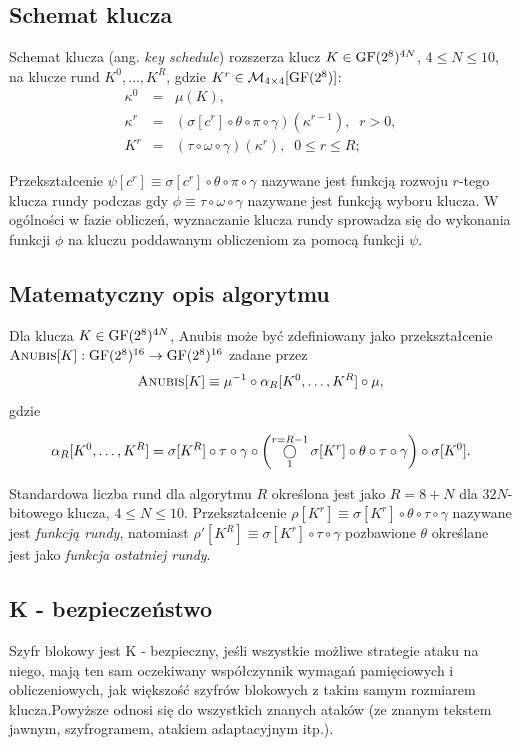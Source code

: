 \subsection{Schemat klucza}

Schemat klucza (ang. \textit{key schedule}) rozszerza klucz $K \in \mathrm{GF}(2^8)^{4N}$, $4
\leqslant N \leqslant 10$, na klucze rund $K^0,\dots, K^R$, gdzie $K^r \in \mathcal{M}_{4 \times 4}[\mathrm{GF}(2^8)]$:
\begin{eqnarray*}
\kappa^0 & = & \mu(K),\\
\kappa^r & = & (\sigma[c^r] \circ \theta
\circ \pi \circ \gamma)(\kappa^{r-1}), \;\; r > 0,\\
K^r & = & (\tau \circ \omega \circ \gamma)(\kappa^r), \;\; 0
\leqslant r \leqslant R;
\end{eqnarray*}

Przekształcenie $\psi[c^r] \equiv \sigma[c^r] \circ \theta
\circ \pi \circ \gamma$ nazywane jest funkcją rozwoju $r$-tego klucza rundy podczas gdy $\phi \equiv \tau \circ \omega \circ \gamma$ nazywane jest funkcją wyboru klucza. W ogólności w fazie obliczeń, wyznaczanie klucza rundy sprowadza się do wykonania funkcji $\phi$ na kluczu poddawanym obliczeniom za pomocą funkcji $\psi$.


\subsection{Matematyczny opis algorytmu}
Dla klucza $K \in \mathrm{GF}(2^8)^{4N}$, Anubis może być zdefiniowany jako przekształcenie $\textsc{Anubis}[K]: \mathrm{GF}(2^8)^{16} \rightarrow \mathrm{GF}(2^8)^{16}$ zadane przez
\[
\textsc{Anubis}[K] \equiv \mu^{-1} \circ \alpha_R[K^0, \dots, K^R] \circ \mu,
\]
gdzie

\[
\alpha_R[K^0, \dots, K^R] = \sigma[K^R] \circ \tau \circ \gamma
\circ \left(\mathop{\bigcirc}\displaylimits^{r=R-1}_1{\sigma[K^r] \circ \theta \circ
\tau \circ \gamma}\right) \circ \sigma[K^0].
\]

Standardowa liczba rund dla algorytmu $R$ określona jest jako $R = 8 + N$ dla $32N$-bitowego klucza, $4 \leqslant N \leqslant 10$. Przekształcenie $\rho[K^r] \equiv \sigma[K^r] \circ \theta \circ \tau
\circ \gamma$ nazywane jest \textit{funkcją rundy}, natomiast $\rho'[K^R] \equiv \sigma[K^r]
\circ \tau \circ \gamma$ pozbawione $\theta$ określane jest jako \textit{funkcja ostatniej rundy}.

\subsection{K - bezpieczeństwo}
\begin{definition}
Szyfr blokowy jest K - bezpieczny, jeśli wszystkie możliwe strategie ataku na niego, mają ten sam oczekiwany współczynnik wymagań pamięciowych i obliczeniowych, jak większość szyfrów blokowych z takim samym rozmiarem klucza.Powyższe odnosi się do wszystkich znanych ataków (ze znanym tekstem jawnym, szyfrogramem, atakiem adaptacyjnym itp.).
\end{definition}

